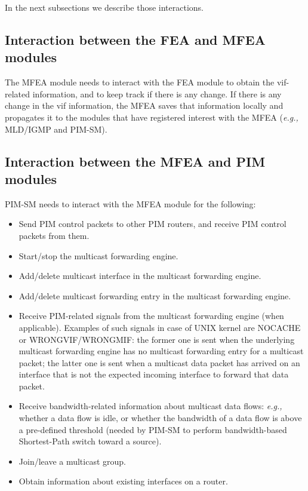 \documentclass[11pt]{article}
\newcommand{\eg}{\emph{e.g.,}\xspace}
\begin{document}
In the next subsections we describe those interactions.

\subsection{Interaction between the FEA and MFEA modules}

The MFEA module needs to interact with the FEA module to obtain the
vif-related information, and to keep track if there is any change.
If there is any change in the vif information, the MFEA saves that
information locally and propagates it to the modules that have
registered interest with the MFEA (\eg MLD/IGMP and PIM-SM).

\subsection{Interaction between the MFEA and PIM modules}

PIM-SM needs to interact with the MFEA module for the following:

\begin{itemize}

  \item Send PIM control packets to other PIM routers, and receive PIM
  control packets from them.

  \item Start/stop the multicast forwarding engine.

  \item Add/delete multicast interface in the multicast forwarding
  engine.

  \item Add/delete multicast forwarding entry in the multicast
  forwarding engine.

  \item Receive PIM-related signals from the multicast forwarding engine
  (when applicable). Examples of such signals in case of UNIX kernel are
  NOCACHE or WRONGVIF/WRONGMIF: the former one is sent when the
  underlying multicast
  forwarding engine has no multicast forwarding entry for a multicast
  packet; the latter one is sent when a multicast data packet has
  arrived on an interface that is not the expected incoming interface to
  forward that data packet.

  \item Receive bandwidth-related information about multicast data
  flows: \eg whether a data flow is idle, or whether the bandwidth of a
  data flow is above a pre-defined threshold (needed by PIM-SM to perform
  bandwidth-based Shortest-Path switch toward a source).

  \item Join/leave a multicast group.

  \item Obtain information about existing interfaces on a router.

\end{itemize}
\end{document}
